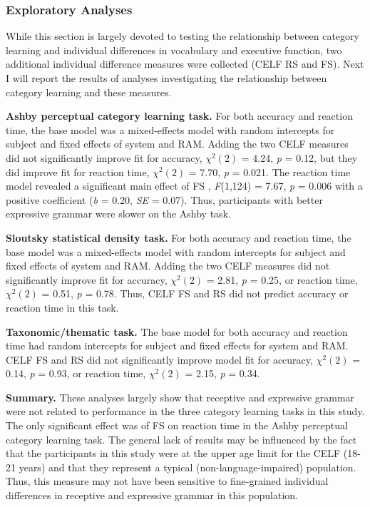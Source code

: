 \documentclass[../dissertation.tex]{subfiles}
\begin{document}
\subsubsection{Exploratory Analyses}

While this section is largely devoted to testing the relationship between category learning and individual differences in vocabulary and executive function, two additional individual difference measures were collected (CELF RS and FS). Next I will report the results of analyses investigating the relationship between category learning and these measures. \par
\textbf{Ashby perceptual category learning task.} For both accuracy and reaction time, the base model was a mixed-effects model with random intercepts for subject and fixed effects of system and RAM. Adding the two CELF measures did not significantly improve fit for accuracy, $\chi^{2}(2)$ = 4.24, \textit{p} = 0.12, but they did improve fit for reaction time, $\chi^{2}(2)$ = 7.70, \textit{p} = 0.021. The reaction time model revealed a significant main effect of FS , \textit{F}(1,124) = 7.67, \textit{p} = 0.006 with a positive coefficient (\textit{b} = 0.20, \textit{SE} = 0.07). Thus, participants with better expressive grammar were slower on the Ashby task. \par
\textbf{Sloutsky statistical density task.} For both accuracy and reaction time, the base model was a mixed-effects model with random intercepts for subject and fixed effects of system and RAM. Adding the two CELF measures did not significantly improve fit for accuracy, $\chi^{2}(2)$ = 2.81, \textit{p} = 0.25, or reaction time, $\chi^{2}(2)$ = 0.51, \textit{p} = 0.78. Thus, CELF FS and RS did not predict accuracy or reaction time in this task. \par
\textbf{Taxonomic/thematic task.} The base model for both accuracy and reaction time had random intercepts for subject and fixed effects for system and RAM. CELF FS and RS did not significantly improve model fit for accuracy, $\chi^{2}(2)$ = 0.14, \textit{p} = 0.93, or reaction time, $\chi^{2}(2)$ = 2.15, \textit{p} = 0.34. \par
\textbf{Summary.} These analyses largely show that receptive and expressive grammar were not related to performance in the three category learning tasks in this study. The only significant effect was of FS on reaction time in the Ashby perceptual category learning task. The general lack of results may be influenced by the fact that the participants in this study were at the upper age limit for the CELF (18-21 years) and that they represent a typical (non-language-impaired) population. Thus, this measure may not have been sensitive to fine-grained individual differences in receptive and expressive grammar in this population.
\end{document}
